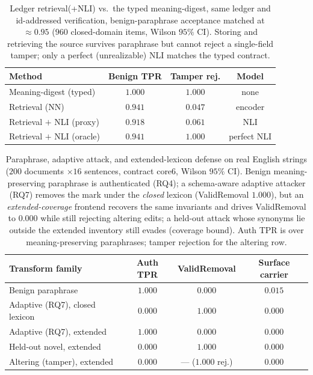 \documentclass[11pt]{article}
\begin{document}
\begin{table}[t]
\centering
\caption{Ledger retrieval(+NLI) vs.\ the typed meaning-digest, same ledger and
id-addressed verification, benign-paraphrase acceptance matched at $\approx0.95$
($960$ closed-domain items, Wilson $95\%$ CI). Storing and retrieving the source
survives paraphrase but cannot reject a single-field tamper; only a perfect
(unrealizable) NLI matches the typed contract.}
\label{tab:retrieval}
\footnotesize
\begin{tabular}{lccc}
\toprule
Method & Benign TPR & Tamper rej. & Model \\
\midrule
Meaning-digest (typed)      & $1.000$ & $1.000$ & none \\
Retrieval (NN)              & $0.941$ & $0.047$ & encoder \\
Retrieval $+$ NLI (proxy)   & $0.918$ & $0.061$ & NLI \\
Retrieval $+$ NLI (oracle)  & $0.941$ & $1.000$ & perfect NLI \\
\bottomrule
\end{tabular}
\end{table}

\begin{table}[t]
\centering
\caption{Paraphrase, adaptive attack, and extended-lexicon defense on real
English strings ($200$ documents $\times16$ sentences, contract core6, Wilson
$95\%$ CI). Benign meaning-preserving paraphrase is authenticated (RQ4); a
schema-aware adaptive attacker (RQ7) removes the mark under the \emph{closed}
lexicon (ValidRemoval $1.000$), but an \emph{extended-coverage} frontend recovers
the same invariants and drives ValidRemoval to $0.000$ while still rejecting
altering edits; a held-out attack whose synonyms lie outside the extended
inventory still evades (coverage bound). Auth TPR is over meaning-preserving
paraphrases; tamper rejection for the altering row.}
\label{tab:paraphrase}
\footnotesize
\begin{tabular}{lccc}
\toprule
Transform family & Auth TPR & ValidRemoval & Surface carrier \\
\midrule
Benign paraphrase              & $1.000$ & $0.000$ & $0.015$ \\
Adaptive (RQ7), closed lexicon & $0.000$ & $1.000$ & $0.000$ \\
Adaptive (RQ7), extended       & $1.000$ & $0.000$ & $0.000$ \\
Held-out novel, extended       & $0.000$ & $1.000$ & $0.000$ \\
Altering (tamper), extended    & $0.000$ & --- ($1.000$ rej.) & $0.000$ \\
\bottomrule
\end{tabular}
\end{table}
\end{document}
